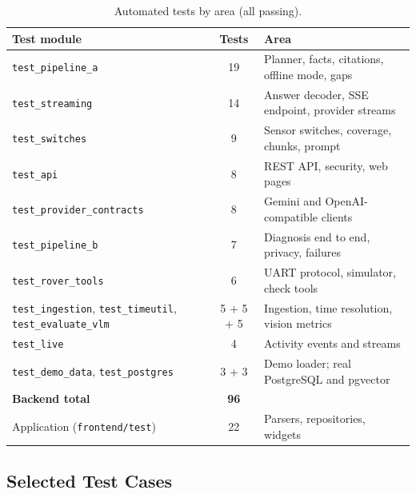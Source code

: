 \begin{table}[H]
\centering
\caption{Automated tests by area (all passing).}
\label{tab:testcount}
\small
\begin{tabular}{|P{6.1cm}|c|P{5.2cm}|}
\hline
\textbf{Test module} & \textbf{Tests} & \textbf{Area}\\\hline
\texttt{test\_pipeline\_a} & 19 & Planner, facts, citations, offline mode, gaps\\\hline
\texttt{test\_streaming} & 14 & Answer decoder, SSE endpoint, provider streams\\\hline
\texttt{test\_switches} & 9 & Sensor switches, coverage, chunks, prompt\\\hline
\texttt{test\_api} & 8 & REST API, security, web pages\\\hline
\texttt{test\_provider\_contracts} & 8 & Gemini and OpenAI-compatible clients\\\hline
\texttt{test\_pipeline\_b} & 7 & Diagnosis end to end, privacy, failures\\\hline
\texttt{test\_rover\_tools} & 6 & UART protocol, simulator, check tools\\\hline
\texttt{test\_ingestion}, \texttt{test\_timeutil}, \texttt{test\_evaluate\_vlm} & 5 + 5 + 5 & Ingestion, time resolution, vision metrics\\\hline
\texttt{test\_live} & 4 & Activity events and streams\\\hline
\texttt{test\_demo\_data}, \texttt{test\_postgres} & 3 + 3 & Demo loader; real PostgreSQL and pgvector\\\hline
\textbf{Backend total} & \textbf{96} & \\\hline
Application (\texttt{frontend/test}) & 22 & Parsers, repositories, widgets\\\hline
\end{tabular}
\end{table}

\subsection{Selected Test Cases}

